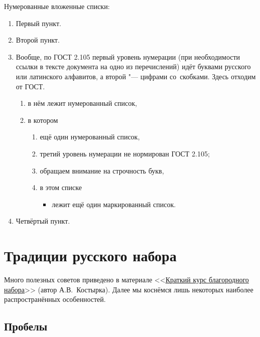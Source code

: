 \noindent Нумерованные вложенные списки:
\begin{enumerate}
    \item Первый пункт.
    \item Второй пункт.
    \item Вообще, по ГОСТ 2.105 первый уровень нумерации
          (при необходимости ссылки в тексте документа на одно из перечислений)
          идёт буквами русского или латинского алфавитов,
          а второй "--- цифрами со~скобками.
          Здесь отходим от ГОСТ.
          \begin{enumerate}
              \item в нём лежит нумерованный список,
              \item в котором
                    \begin{enumerate}
                        \item ещё один нумерованный список,
                        \item третий уровень нумерации не нормирован ГОСТ 2.105;
                        \item обращаем внимание на строчность букв,
                        \item в этом списке
                              \begin{itemize}
                                  \item лежит ещё один маркированный список.
                              \end{itemize}
                    \end{enumerate}

          \end{enumerate}

    \item Четвёртый пункт.
\end{enumerate}

\section{Традиции русского набора}

Много полезных советов приведено в материале
<<\href{https://kostyrka.ru/main/ru/typesetting-and-typography-crash-course-by-kostyrka/}{Краткий курс благородного набора}>>
(автор А.\:В.~Костырка).
Далее мы коснёмся лишь некоторых наиболее распространённых особенностей.

\subsection{Пробелы}

